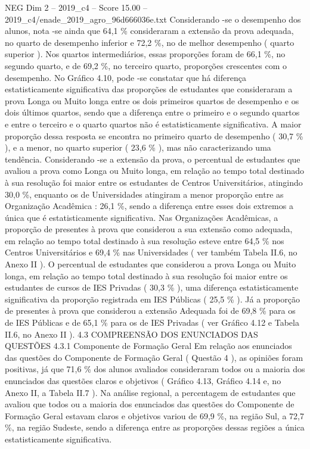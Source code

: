 \begin{textsample}{NEG Dim 2 – 2019\_c4 – Score 15.00 – 2019\_c4/enade\_2019\_agro\_96d666036e.txt}
Considerando -se o desempenho dos alunos, nota -se ainda que 64,1 \% consideraram a extensão da prova adequada, no quarto de desempenho inferior e 72,2 \%, no de melhor desempenho ( quarto superior ).
Nos quartos intermediários, essas proporções foram de 66,1 \%, no segundo quarto, e de 69,2 \%, no terceiro quarto, proporções crescentes com o desempenho.
No Gráfico 4.10, pode -se constatar que há diferença estatisticamente significativa das proporções de estudantes que consideraram a prova Longa ou Muito longa entre os dois primeiros quartos de desempenho e os dois últimos quartos, sendo que a diferença entre o primeiro e o segundo quartos e entre o terceiro e o quarto quartos não é estatisticamente significativa.
A maior proporção dessa resposta se encontra no primeiro quarto de desempenho ( 30,7 \% ), e a menor, no quarto superior ( 23,6 \% ), mas não caracterizando uma tendência.
Considerando -se a extensão da prova, o percentual de estudantes que avaliou a prova como Longa ou Muito longa, em relação ao tempo total destinado à sua resolução foi maior entre os estudantes de Centros Universitários, atingindo 30,0 \%, enquanto os de Universidades atingiram a menor proporção entre as Organização Acadêmica : 26,1 \%, sendo a diferença entre esses dois extremos a única que é estatisticamente significativa.
Nas Organizações Acadêmicas, a proporção de presentes à prova que considerou a sua extensão como adequada, em relação ao tempo total destinado à sua resolução esteve entre 64,5 \% nos Centros Universitários e 69,4 \% nas Universidades ( ver também Tabela II.6, no Anexo II ).
O percentual de estudantes que considerou a prova Longa ou Muito longa, em relação ao tempo total destinado à sua resolução foi maior entre os estudantes de cursos de IES Privadas ( 30,3 \% ), uma diferença estatisticamente significativa da proporção registrada em IES Públicas ( 25,5 \% ).
Já a proporção de presentes à prova que considerou a extensão Adequada foi de 69,8 \% para os de IES Públicas e de 65,1 \% para os de IES Privadas ( ver Gráfico 4.12 e Tabela II.6, no Anexo II ). 4.3 COMPREENSÃO DOS ENUNCIADOS DAS QUESTÕES 4.3.1 Componente de Formação Geral Em relação aos enunciados das questões do Componente de Formação Geral ( Questão 4 ), as opiniões foram positivas, já que 71,6 \% dos alunos avaliados consideraram todos ou a maioria dos enunciados das questões claros e objetivos ( Gráfico 4.13, Gráfico 4.14 e, no Anexo II, a Tabela II.7 ).
Na análise regional, a percentagem de estudantes que avaliou que todos ou a maioria dos enunciados das questões do Componente de Formação Geral estavam claros e objetivos variou de 69,9 \%, na região Sul, a 72,7 \%, na região Sudeste, sendo a diferença entre as proporções dessas regiões a única estatisticamente significativa.

\end{textsample}
